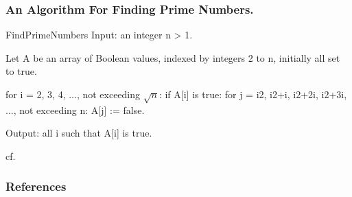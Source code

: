 \documentclass{ctexbeamer}
\begin{document}
\begin{frame}
  \frametitle{An Algorithm For Finding Prime Numbers.}
  \begin{Code}{FindPrimeNumbers}
Input: an integer n > 1.

Let A be an array of Boolean values, indexed by integers 2 to n,
initially all set to true.

for i = 2, 3, 4, ..., not exceeding $\sqrt n$:
  if A[i] is true:
    for j = i2, i2+i, i2+2i, i2+3i, ..., not exceeding n:
      A[j] := false.

Output: all i such that A[i] is true.
  \end{Code}
  cf. \cite{wikipedia:sieve}
\end{frame}


\nocite{*}
\begin{frame}[allowframebreaks]
  \frametitle{References}
  \printbibliography
\end{frame}
\end{document}
